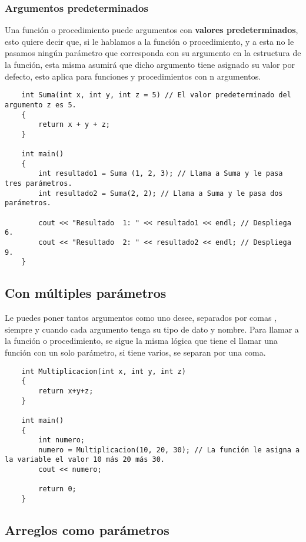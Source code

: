 \subsubsection{Argumentos predeterminados}

Una función o procedimiento puede argumentos con \textbf{valores predeterminados}, esto quiere decir que, si le hablamos a la función o procedimiento, y a esta no le pasamos ningún parámetro que corresponda con su argumento en la estructura de la función, esta misma asumirá que dicho argumento tiene asignado su valor por defecto, esto aplica para funciones y procedimientos con n argumentos.
\begin{lstlisting}
    int Suma(int x, int y, int z = 5) // El valor predeterminado del argumento z es 5.
    {
        return x + y + z;
    }
    
    int main()
    {
        int resultado1 = Suma (1, 2, 3); // Llama a Suma y le pasa tres parámetros.
        int resultado2 = Suma(2, 2); // Llama a Suma y le pasa dos parámetros.
        
        cout << "Resultado  1: " << resultado1 << endl; // Despliega 6.
        cout << "Resultado  2: " << resultado2 << endl; // Despliega 9.
    }
\end{lstlisting}


\subsection{Con múltiples parámetros}

Le puedes poner tantos argumentos como uno desee, separados por comas , siempre y cuando cada argumento tenga su tipo de dato y nombre. Para llamar a la función o procedimiento, se sigue la misma lógica que tiene el llamar una función con un solo parámetro, si tiene varios, se separan por una coma. 
\begin{lstlisting}
    int Multiplicacion(int x, int y, int z)
    {
        return x+y+z;
    }
    
    int main()
    {
        int numero;
        numero = Multiplicacion(10, 20, 30); // La función le asigna a la variable el valor 10 más 20 más 30.
        cout << numero;
        
        return 0;
    }
\end{lstlisting}


\subsection{Arreglos como parámetros}


